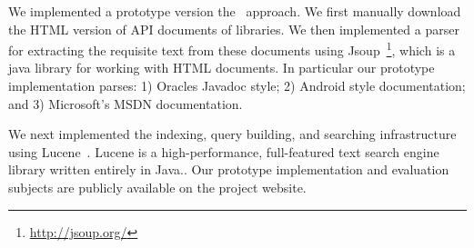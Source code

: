 We implemented a prototype version the \tool\ approach.
We first manually download the HTML version of API documents of libraries. 
We then implemented a parser for extracting the requisite text from these documents using 
Jsoup~\footnote{\url{http://jsoup.org/}}, which is a java library for working with HTML documents.
In particular our prototype implementation parses: 
1) Oracles Javadoc style;
2) Android style documentation; and
3) Microsoft's  MSDN documentation.

We next implemented the indexing, query building, and searching infrastructure using Lucene~\cite{lucene}.
Lucene is a high-performance, full-featured text search engine library written entirely in Java..
Our prototype implementation and evaluation subjects are publicly available on the project website.  

